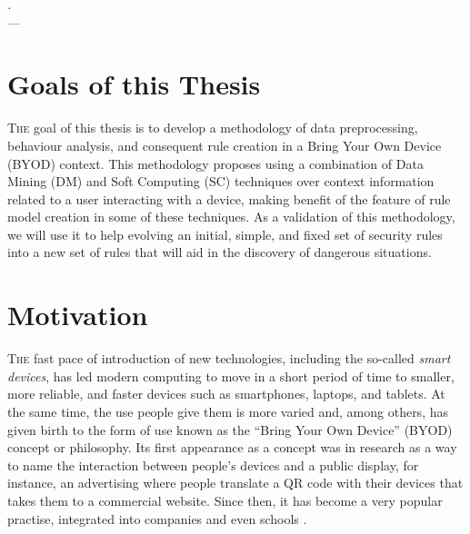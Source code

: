 \label{chap:introduction}
\begin{flushright}{\slshape
    .} \\ \medskip
    --- {}
\end{flushright}
\minitoc\mtcskip
\vfill



\section{Goals of this Thesis} 

\lettrine{T}{he} goal of this thesis is to develop a methodology of data preprocessing, behaviour analysis, and consequent rule creation in a Bring Your Own Device (BYOD) context. This methodology proposes using a combination of Data Mining (DM) and Soft Computing (SC) techniques %
 over context information related to a user interacting with a device, making benefit of the feature of rule model creation in some of these techniques. As a validation of this methodology, we will use it to help evolving an initial, simple, and fixed set of security rules into a new set of rules that will aid in the discovery of dangerous situations.

\section{Motivation}
\label{sec:intro:byod}

\lettrine{T}{he} fast pace of introduction of new technologies, including the so-called \textit{smart devices}, has led modern computing to move in a short period of time to smaller, more reliable, and faster devices such as smartphones, laptops, and tablets. At the same time, the use people give them is more varied and, among others, has given birth to the form of use known as the ``Bring Your Own Device'' (BYOD) concept or philosophy. Its first appearance as a concept was in research \cite{ballagas2004byod} as a way to name the interaction between people's devices and a public display, for instance, an advertising where people translate a QR code with their devices that takes them to a commercial website. %
Since then, it has become a very popular practise, integrated into companies \cite{thomson2012byod} and even schools \cite{song2014bring}.

